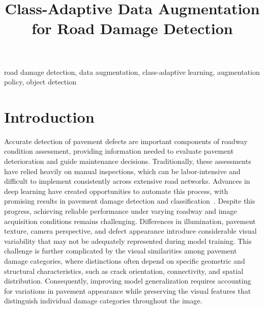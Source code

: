 \documentclass[conference]{IEEEtran}
\begin{document}
\title{Class-Adaptive Data Augmentation for Road Damage Detection}
\maketitle



\begin{IEEEkeywords}
road damage detection, data augmentation, class-adaptive learning, augmentation policy, object detection
\end{IEEEkeywords}

\section{Introduction}

Accurate detection of pavement defects are important components of roadway condition assessment, providing information needed to evaluate pavement deterioration and guide maintenance decisions. Traditionally, these assessments have relied heavily on manual inspections, which can be labor-intensive and difficult to implement consistently across extensive road networks. Advances in deep learning have created opportunities to automate this process, with promising results in pavement damage detection and classification~\cite{shang2024automated,zheng2024deep,vision2025inspection}. Despite this progress, achieving reliable performance under varying roadway and image acquisition conditions remains challenging. Differences in illumination, pavement texture, camera perspective, and defect appearance introduce considerable visual variability that may not be adequately represented during model training. This challenge is further complicated by the visual similarities among pavement damage categories, where distinctions often depend on specific geometric and structural characteristics, such as crack orientation, connectivity, and spatial distribution. Consequently, improving model generalization requires accounting for variations in pavement appearance while preserving the visual features that distinguish individual damage categories throughout the image.
\end{document}
